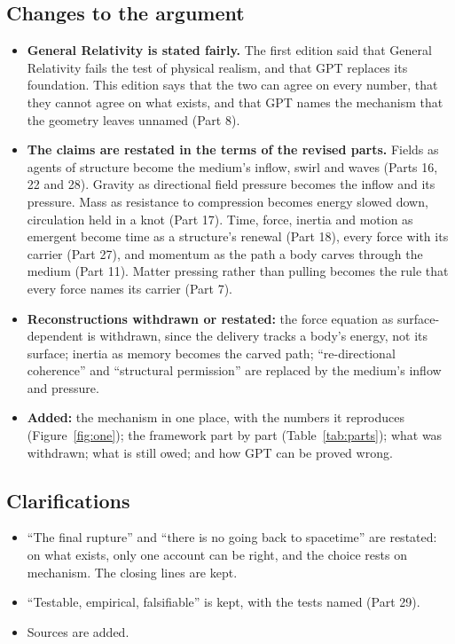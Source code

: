 \subsection*{Changes to the argument}
\begin{itemize}
\item \textbf{General Relativity is stated fairly.} The first edition said that General Relativity fails the test of physical realism, and that GPT replaces its foundation. This edition says that the two can agree on every number, that they cannot agree on what exists, and that GPT names the mechanism that the geometry leaves unnamed (Part 8).
\item \textbf{The claims are restated in the terms of the revised parts.} Fields as agents of structure become the medium's inflow, swirl and waves (Parts 16, 22 and 28). Gravity as directional field pressure becomes the inflow and its pressure. Mass as resistance to compression becomes energy slowed down, circulation held in a knot (Part 17). Time, force, inertia and motion as emergent become time as a structure's renewal (Part 18), every force with its carrier (Part 27), and momentum as the path a body carves through the medium (Part 11). Matter pressing rather than pulling becomes the rule that every force names its carrier (Part 7).
\item \textbf{Reconstructions withdrawn or restated:} the force equation as surface-dependent is withdrawn, since the delivery tracks a body's energy, not its surface; inertia as memory becomes the carved path; ``re-directional coherence'' and ``structural permission'' are replaced by the medium's inflow and pressure.
\item \textbf{Added:} the mechanism in one place, with the numbers it reproduces (Figure~\ref{fig:one}); the framework part by part (Table~\ref{tab:parts}); what was withdrawn; what is still owed; and how GPT can be proved wrong.
\end{itemize}

\subsection*{Clarifications}
\begin{itemize}
\item ``The final rupture'' and ``there is no going back to spacetime'' are restated: on what exists, only one account can be right, and the choice rests on mechanism. The closing lines are kept.
\item ``Testable, empirical, falsifiable'' is kept, with the tests named (Part 29).
\item Sources are added.
\end{itemize}

\nocite{rashadaPart15}


